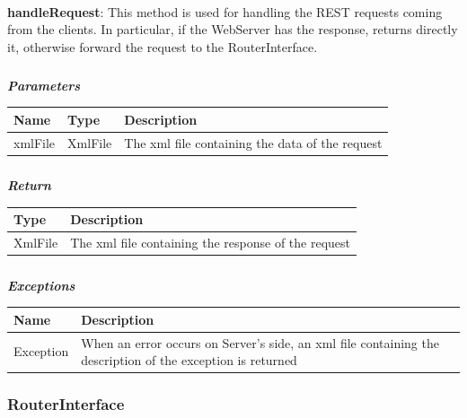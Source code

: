 					\paragraph{}
							\textbf{handleRequest}: This method is used for handling the REST requests coming from the clients. In particular, if the WebServer has the response, returns directly it, otherwise forward the request to the RouterInterface.
							\subparagraph{}
							\textit{\textbf{Parameters}}
								\begin{table}[!h]
									\begin{tabular}{L{0.2\textwidth}L{0.2\textwidth}L{0.2\textwidth}}
										\toprule
										Name & Type & Description \\
										\midrule
								  		xmlFile & XmlFile & The xml file containing the data of the request \\
								 		\bottomrule
									\end{tabular}
								\end{table}
							\subparagraph{}
								\textit{\textbf{Return}}
									\begin{table}[!h]
									\begin{tabular}{L{0.3\textwidth}L{0.3\textwidth}}
										\toprule
										Type & Description \\
										\midrule
								  		XmlFile & The xml file containing the response of the request \\
								 		\bottomrule
									\end{tabular}
								\end{table}
							\subparagraph{}
								\textit{\textbf{Exceptions}}
									\begin{table}[!h]
									\begin{tabular}{L{0.3\textwidth}L{0.3\textwidth}}
										\toprule
										Name & Description \\
										\midrule
								  		Exception & When an error occurs on Server's side, an xml file containing the description of the exception is returned \\ 
								 		\bottomrule
									\end{tabular}
								\end{table}
								
				\subsubsection{RouterInterface}
